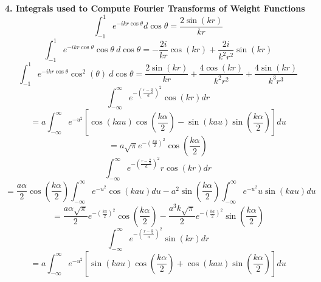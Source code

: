 \documentclass[12pt]{article}
\begin{document}
\textbf{4. Integrals used to Compute Fourier Transforms of Weight Functions}
\begin{equation}{\int_{-1}^{1}{e^{-ikr\cos{\theta}}d{\cos{\theta}}}=\frac{2\sin(kr)}{kr}}\end{equation} 
\begin{equation}{\int_{-1}^{1}{e^{-ikr\cos{\theta}}\cos{\theta}{~}d{\cos{\theta}}}=-\frac{2i}{kr}\cos(kr)+\frac{2i}{k^2r^2}\sin(kr)}\end{equation} 
\[{}\]
\begin{equation}{\int_{-1}^{1}{e^{-ikr\cos{\theta}}\cos^2(\theta)~d{\cos{\theta}}}=\frac{2\sin(kr)}{kr}+\frac{4\cos(kr)}{k^2r^2}+\frac{4\sin(kr)}{k^3r^3}}\end{equation} 
\[{}\]
\[{}\]
\begin{equation}{\int_{-\infty}^{\infty}{e^{-\left(\frac{r-\frac{\alpha}{2}}{a}\right)^2}\cos(kr)d{r}}}\end{equation}
\begin{displaymath}{=a\int_{-\infty}^{\infty}{e^{-u^2}\left[\cos(kau)\cos(\frac{k\alpha}{2})-\sin(kau)\sin(\frac{k\alpha}{2})\right]d{u}}}\end{displaymath}  
\begin{equation}{=a\sqrt{\pi}e^{-\left(\frac{ka}{2}\right)^2}\cos(\frac{k\alpha}{2})}\end{equation} 
\[{}\]
\[{}\]
\begin{equation}{\int_{-\infty}^{\infty}{e^{-\left(\frac{r-\frac{\alpha}{2}}{a}\right)^2}r\cos(kr)d{r}}}\end{equation}
\begin{equation}{=\frac{a\alpha}{2}\cos\left(\frac{k\alpha}{2}\right)\int_{-\infty}^{\infty}{e^{-u^2}\cos(kau)d{u}} -a^2\sin\left(\frac{k\alpha}{2}\right)\int_{-\infty}^{\infty}{e^{-u^2}u\sin(kau)d{u}}}\end{equation}
\begin{equation}{=\frac{a\alpha\sqrt{\pi}}{2}e^{-\left(\frac{ka}{2}\right)^2}\cos\left(\frac{k\alpha}{2}\right)-\frac{a^3k\sqrt{\pi}}{2}e^{-\left(\frac{ka}{2}\right)^2}\sin\left(\frac{k\alpha}{2}\right)}\end{equation}
\[{}\]
\begin{equation}{\int_{-\infty}^{\infty}{e^{-\left(\frac{r-\frac{\alpha}{2}}{a}\right)^2}\sin(kr)d{r}}}\end{equation} 
\begin{displaymath}{=a\int_{-\infty}^{\infty}{e^{-u^2}\left[\sin(kau)\cos(\frac{k\alpha}{2})+\cos(kau)\sin(\frac{k\alpha}{2})\right]d{u}}}\end{displaymath}  
\end{document}
